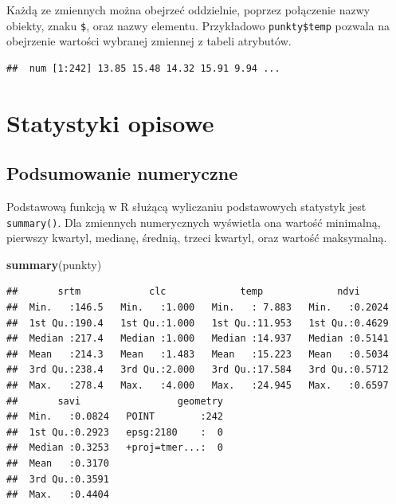 \documentclass[
  paper=6in:9in,pagesize=pdftex,headinclude=on,footinclude=on,10pt]{scrbook}
\newenvironment{Shaded}{\begin{snugshade}}{\end{snugshade}}
\newcommand{\FunctionTok}[1]{\textcolor[rgb]{0.13,0.29,0.53}{\textbf{#1}}}
\newcommand{\NormalTok}[1]{#1}
\newcommand{\SpecialCharTok}[1]{\textcolor[rgb]{0.81,0.36,0.00}{\textbf{#1}}}
\begin{document}
Każdą ze zmiennych można obejrzeć oddzielnie, poprzez połączenie nazwy obiekty, znaku \texttt{\$}, oraz nazwy elementu.
Przykładowo \texttt{punkty\$temp} pozwala na obejrzenie wartości wybranej zmiennej z tabeli atrybutów.

\begin{Shaded}
\end{Shaded}

\begin{verbatim}
##  num [1:242] 13.85 15.48 14.32 15.91 9.94 ...
\end{verbatim}

\section{Statystyki opisowe}\label{statystyki-opisowe}

\subsection{Podsumowanie numeryczne}\label{podsumowanie-numeryczne}

Podstawową funkcją w R służącą wyliczaniu podstawowych statystyk jest \texttt{summary()}.
Dla zmiennych numerycznych wyświetla ona wartość minimalną, pierwszy kwartyl, medianę, średnią, trzeci kwartyl, oraz wartość maksymalną.

\begin{Shaded}
\begin{Highlighting}[]
\FunctionTok{summary}\NormalTok{(punkty)}
\end{Highlighting}
\end{Shaded}

\begin{verbatim}
##       srtm            clc             temp             ndvi       
##  Min.   :146.5   Min.   :1.000   Min.   : 7.883   Min.   :0.2024  
##  1st Qu.:190.4   1st Qu.:1.000   1st Qu.:11.953   1st Qu.:0.4629  
##  Median :217.4   Median :1.000   Median :14.937   Median :0.5141  
##  Mean   :214.3   Mean   :1.483   Mean   :15.223   Mean   :0.5034  
##  3rd Qu.:238.4   3rd Qu.:2.000   3rd Qu.:17.584   3rd Qu.:0.5712  
##  Max.   :278.4   Max.   :4.000   Max.   :24.945   Max.   :0.6597  
##       savi                 geometry  
##  Min.   :0.0824   POINT        :242  
##  1st Qu.:0.2923   epsg:2180    :  0  
##  Median :0.3253   +proj=tmer...:  0  
##  Mean   :0.3170                      
##  3rd Qu.:0.3591                      
##  Max.   :0.4404
\end{verbatim}
\end{document}
